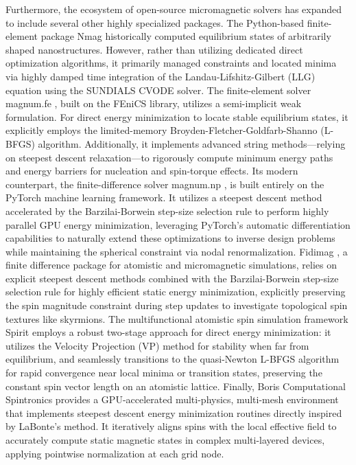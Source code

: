 \documentclass[10pt, a4paper, twocolumn]{article}
\begin{document}
Furthermore, the ecosystem of open-source micromagnetic solvers has expanded to include several other highly specialized packages. The Python-based finite-element package Nmag \cite{Fischbacher2007} historically computed equilibrium states of arbitrarily shaped nanostructures. However, rather than utilizing dedicated direct optimization algorithms, it primarily managed constraints and located minima via highly damped time integration of the Landau-Lifshitz-Gilbert (LLG) equation using the SUNDIALS CVODE solver. The finite-element solver magnum.fe \cite{Abert2013}, built on the FEniCS library, utilizes a semi-implicit weak formulation. For direct energy minimization to locate stable equilibrium states, it explicitly employs the limited-memory Broyden-Fletcher-Goldfarb-Shanno (L-BFGS) algorithm. Additionally, it implements advanced string methods—relying on steepest descent relaxation—to rigorously compute minimum energy paths and energy barriers for nucleation and spin-torque effects. Its modern counterpart, the finite-difference solver magnum.np \cite{Bruckner2023}, is built entirely on the PyTorch machine learning framework. It utilizes a steepest descent method accelerated by the Barzilai-Borwein step-size selection rule to perform highly parallel GPU energy minimization, leveraging PyTorch's automatic differentiation capabilities to naturally extend these optimizations to inverse design problems while maintaining the spherical constraint via nodal renormalization. Fidimag \cite{Bisotti2018}, a finite difference package for atomistic and micromagnetic simulations, relies on explicit steepest descent methods combined with the Barzilai-Borwein step-size selection rule for highly efficient static energy minimization, explicitly preserving the spin magnitude constraint during step updates to investigate topological spin textures like skyrmions. The multifunctional atomistic spin simulation framework Spirit \cite{Muller2019} employs a robust two-stage approach for direct energy minimization: it utilizes the Velocity Projection (VP) method for stability when far from equilibrium, and seamlessly transitions to the quasi-Newton L-BFGS algorithm for rapid convergence near local minima or transition states, preserving the constant spin vector length on an atomistic lattice. Finally, Boris Computational Spintronics \cite{Lepadatu2020} provides a GPU-accelerated multi-physics, multi-mesh environment that implements steepest descent energy minimization routines directly inspired by LaBonte’s method. It iteratively aligns spins with the local effective field to accurately compute static magnetic states in complex multi-layered devices, applying pointwise normalization at each grid node.
\end{document}
